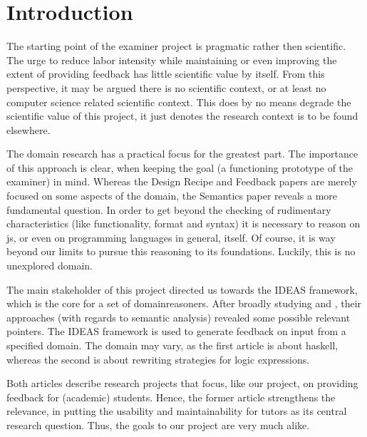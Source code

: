 
\section{Introduction}

The starting point of the 
\gls{examiner} project is pragmatic rather then scientific. 
The urge to reduce labor intensity while maintaining or even improving the 
extent of providing \gls{feedback} has little scientific value by itself. From 
this perspective, it may be argued there is no scientific context, or at least 
no computer science related scientific context. This does by no means degrade 
the scientific value of this project, it just denotes the research context is 
to be found elsewhere. 


The domain research has a practical focus for the greatest part. The 
importance of this approach is clear, when keeping the goal (a functioning 
prototype of the \gls{examiner}) in mind. Whereas the Design Recipe and 
Feedback papers are merely focused on some aspects of the domain, the 
Semantics paper reveals a more fundamental question. In order to get beyond 
the checking of rudimentary characteristics (like functionality, format and 
syntax) it is necessary to reason on \gls{js}, or even on programming 
languages in general, itself. Of course, it is way beyond our limits to pursue 
this reasoning to its foundations. Luckily, this is no unexplored domain.


The main stakeholder of this project directed us towards the IDEAS framework, 
which is the core for a set of \glspl{domainreasoner}. After broadly studying 
\citep{gerdes2012ask} and \citep{heeren2010specifying}, their approaches (with 
regards to semantic analysis) revealed some possible relevant pointers. The 
IDEAS framework is used to generate feedback on input from a specified domain. 
The domain may vary, as the first article is about \gls{haskell}, whereas the 
second is about rewriting strategies for logic expressions.


Both articles describe research projects that focus, like our project, on
providing feedback for (academic) students. Hence, the former article
strengthens the relevance, in putting the usability and maintainability for 
tutors as its central research question. Thus, the goals to our project are 
very much alike. 


